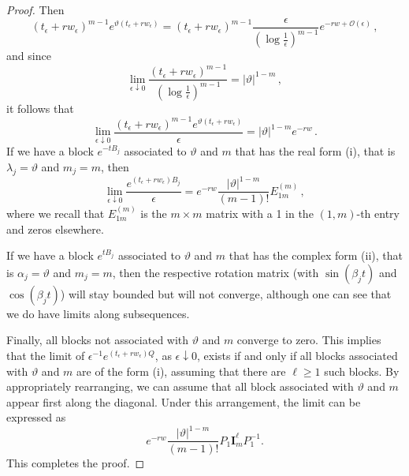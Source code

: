 \documentclass[10pt,a4paper]{amsart}
\begin{document}
\begin{proof}
	Then 
	$$\left(t_\epsilon + r w_\epsilon\right)^{m-1} e^{\vartheta(t_\epsilon + r w_\epsilon)}=\left(t_\epsilon + r w_\epsilon\right)^{m-1}\frac{\epsilon}{\left(\log\frac{1}{\epsilon}\right)^{m-1}}e^{-rw+\mathcal{O}(\epsilon)}\,,$$
	and since 
	$$\lim_{\epsilon\downarrow 0} \frac{\left(t_\epsilon + r w_\epsilon\right)^{m-1}}{\left(\log\frac{1}{\epsilon}\right)^{m-1}}=|\vartheta|^{1-m}\,,$$
	it follows that 
	$$\lim_{\epsilon\downarrow 0}\frac{\left(t_\epsilon + r w_\epsilon\right)^{m-1} e^{ \vartheta(t_\epsilon + r w_\epsilon)}}{\epsilon} =|\vartheta|^{1-m}e^{-rw}\,.$$
	If we have a block $e^{-tB_j}$ associated to $\vartheta$ and $m$ that has the real form (i), that is $\lambda_j=\vartheta$ and $m_j=m$, then
	$$\lim_{\epsilon\downarrow 0}\frac{ e^{ (t_\epsilon+rw_\epsilon) B_j}}{\epsilon}= e^{-rw}\frac{|\vartheta|^{1-m}}{(m-1)!} E^{(m)}_{1m}\,,$$
	where we recall that $E^{(m)}_{1m}$ is the $m\times m$ matrix with a 1 in the $(1,m)$-th entry and zeros elsewhere.
	
	If we have a block $e^{tB_j}$ associated to $\vartheta$ and $m$ that has the complex form (ii), that is $\alpha_j=\vartheta$ and $m_j=m$, then the respective rotation matrix (with $\sin\left(\beta_jt\right)$ and $\cos\left(\beta_j t\right)$) will stay bounded but will not converge, although one can see that we do have limits along subsequences. 
	
	Finally, all  blocks not associated with $\vartheta$ and $m$  converge to zero. This implies  that  the limit of $\epsilon^{-1}e^{ \left(t_\epsilon + r w_\epsilon\right) Q}$, as $\epsilon\downarrow 0$, exists  if and only if all  blocks associated with $\vartheta$ and $m$ are of the form (i),  assuming that there are $\ell\ge 1$ such blocks.  By appropriately rearranging, we can assume that all block associated with $\vartheta$ and $m$ appear first along the diagonal. Under this arrangement, the limit can be expressed as
	$$e^{-rw}\frac{|\vartheta|^{1-m}}{(m-1)!} P_1\mathbf{I}^{\ell}_mP_1^{-1}.$$   
	This completes the proof. \end{proof}
\end{document}
